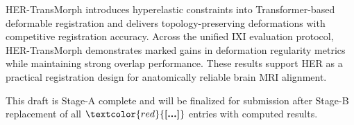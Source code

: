 \documentclass[jimaging,article,submit,pdftex,moreauthors]{Definitions/mdpi}
\providecommand{\PH}[1]{\textcolor{red}{\textbf{[#1]}}}
\begin{document}
HER-TransMorph introduces hyperelastic constraints into Transformer-based deformable registration and delivers topology-preserving deformations with competitive registration accuracy. Across the unified IXI evaluation protocol, HER-TransMorph demonstrates marked gains in deformation regularity metrics while maintaining strong overlap performance. These results support HER as a practical registration design for anatomically reliable brain MRI alignment.

This draft is Stage-A complete and will be finalized for submission after Stage-B replacement of all \(\PH{...}\) entries with computed results.

\vspace{6pt} 




\end{document}
